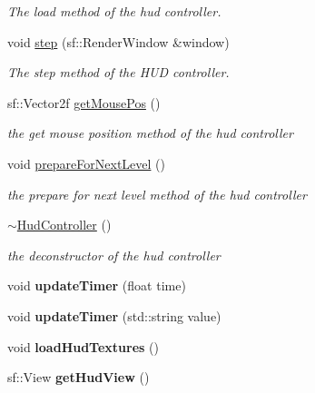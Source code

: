 \begin{DoxyCompactItemize}
\begin{DoxyCompactList}\small\item\em The load method of the hud controller. \end{DoxyCompactList}\item 
void \hyperlink{class_hud_controller_a6cd82988ca9221b6cb8d520a8e26b204}{step} (sf\+::\+Render\+Window \&window)
\begin{DoxyCompactList}\small\item\em The step method of the H\+U\+D controller. \end{DoxyCompactList}\item 
sf\+::\+Vector2f \hyperlink{class_hud_controller_a4c6c9c53841c41d156a2f715a43be703}{get\+Mouse\+Pos} ()
\begin{DoxyCompactList}\small\item\em the get mouse position method of the hud controller \end{DoxyCompactList}\item 
void \hyperlink{class_hud_controller_a9e9c4e19bdb0bc55247c96e79c5548c3}{prepare\+For\+Next\+Level} ()
\begin{DoxyCompactList}\small\item\em the prepare for next level method of the hud controller \end{DoxyCompactList}\item 
\hyperlink{class_hud_controller_a53264716b1a602a351a7bfcebb0d4dc1}{$\sim$\+Hud\+Controller} ()
\begin{DoxyCompactList}\small\item\em the deconstructor of the hud controller \end{DoxyCompactList}\item 
\hypertarget{class_hud_controller_a55b2cf773dafe63e4ea80dee44520b46}{void {\bfseries update\+Timer} (float time)}\label{class_hud_controller_a55b2cf773dafe63e4ea80dee44520b46}

\item 
\hypertarget{class_hud_controller_a286572c787019d2ac71808619f51d09b}{void {\bfseries update\+Timer} (std\+::string value)}\label{class_hud_controller_a286572c787019d2ac71808619f51d09b}

\item 
\hypertarget{class_hud_controller_a42109bcccbd0e6c036d8fca3ad0c1354}{void {\bfseries load\+Hud\+Textures} ()}\label{class_hud_controller_a42109bcccbd0e6c036d8fca3ad0c1354}

\item 
\hypertarget{class_hud_controller_ace2b98787960f4278d783da1cf7b37dc}{sf\+::\+View {\bfseries get\+Hud\+View} ()}\label{class_hud_controller_ace2b98787960f4278d783da1cf7b37dc}

\end{DoxyCompactItemize}
